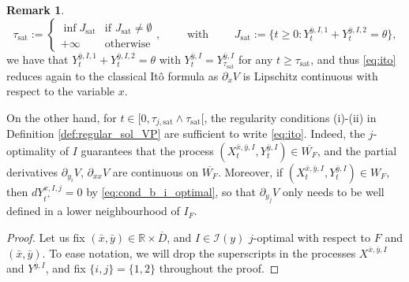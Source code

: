 \documentclass[10pt]{article}
\numberwithin{equation}{section}
\theoremstyle{plain}
\numberwithin{theorem}{section}
\theoremstyle{definition}
\newtheorem{remark}[theorem]{Remark}
\def \R {\mathbb{R}}
\def \p {\partial}
\newcommand{\<}{\langle}
\renewcommand{\>}{\rangle}
\renewcommand{\(}{\left(}
\renewcommand{\)}{\right)}
\def \R  {{\mathbb {R}}}
\def \p {{\partial}}
\def \R {{\mathbb {R}}}
\def\cI{{\mathcal I}}
\begin{document}
{{{\begin{remark}
\begin{equation}
\tau_{\text{sat}}:=\begin{cases} 
\inf J_{\text{sat}}& \text{if } J_{\text{sat}} \neq \emptyset  \\
+\infty & \text{otherwise}
\end{cases}, \qquad  \mbox{ with } \qquad J_{\text{sat}}:=  \{ t\geq 0 : Y^{\bar y, I ,1}_t+Y^{\bar y, I ,2}_t = \theta \}  ,
\end{equation}
we have that $Y_t^{\bar y,I,1} + Y_t^{\bar y,I,2} = \theta$ with $Y^{\bar y,I}_t = Y^{\bar y,I}_{\tau_{\text{sat}}}$ for any $t\geq \tau_{\text{sat}}$, and thus \eqref{eq:ito} reduces again to the classical It\^o formula as $\partial_{x}V$ is Lipschitz continuous with respect to the variable $x$. %

On the other hand, for $t\in [0,\tau_{j,\text{sat}}\wedge\tau_{\text{sat}}[$, the regularity conditions (i)-(ii) in Definition \ref{def:regular_sol_VP} are sufficient to write \eqref{eq:ito}. Indeed, the $j$-optimality of $I$ guarantees that the process $(X^{\bar x,\bar y,I}_t, Y^{\bar y,I}_t)\in \overline{W_F}$, and the partial derivatives $\p_{y_i}V$, $\p_{xx}V$ are continuous on $\overline{W_F}$. Moreover, if $(X^{\bar x,\bar y,I}_t, Y^{\bar y,I}_t)\in W_F$, then $dY^{x,I,j}_{t^+}=0$ by \eqref{eq:cond_b_i_optimal}, so that $\p_{y_j}V$ only needs to be well defined in a lower neighbourhood of $I_F$.
\end{remark}
\begin{proof}
Let us fix $(\bar x, \bar y)\in {\R \times \overline{D}}$, and $I\in \cI(y)$ {$j$-optimal with respect to $F$ and $(\bar x, \bar y)$}. 
To ease notation, we will drop the superscripts in the processes $X^{\bar{x},\bar{y},I}$ and $Y^{\bar{y},I}$, {and fix $\{i,j\}=\{1,2\}$} throughout the proof. 


\end{proof}}}}
\end{document}
